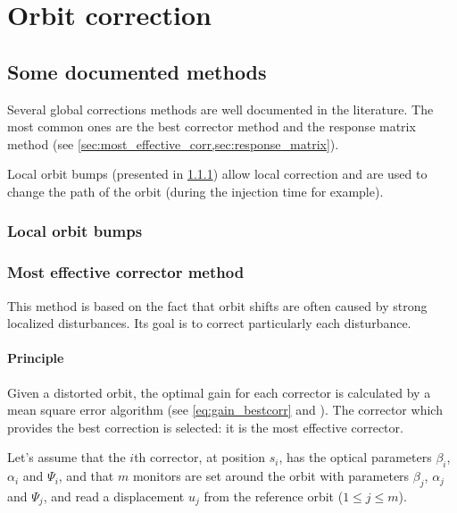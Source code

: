 
\chapter{Orbit correction}
\label{sec:correction}
\section{Some documented methods}

Several global corrections methods are well documented in the literature. The most common ones are the best corrector method and the response matrix method (see \cref{sec:most_effective_corr,sec:response_matrix}). 

Local orbit bumps (presented in \cref{sec:orbit_bump}) allow local correction and are used to change the path of the orbit (during the injection time for example).

\subsection{Local orbit bumps}
\label{sec:orbit_bump}

\subsection{Most effective corrector method}
\label{sec:most_effective_corr}
This method is based on the fact that orbit shifts are often caused by strong localized disturbances. Its goal is to correct particularly each disturbance.

\subsubsection{Principle}

Given a distorted orbit, the optimal gain for each corrector is calculated by a mean square error algorithm (see \cref{eq:gain_bestcorr} and \cite{book:wille}). The corrector which provides the best correction is selected: it is the most effective corrector.

Let's assume that the $i$th corrector, at position $s_i$, has the optical parameters $\beta_i$, $\alpha_i$ and $\Psi_i$, and that $m$ monitors are set around the orbit with parameters $\beta_j$, $\alpha_j$ and $\Psi_j$, and read a displacement $u_j$ from the reference orbit ($1 \leq j \leq m$).

